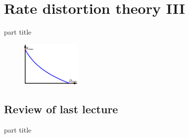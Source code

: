 
\DeclareMathOperator{\cwd}{codeword}
\newtheorem{proposition}{Proposition}
\usepackage{forest}
\usepackage{lipsum}
\usepackage{subcaption}


\section{Rate distortion theory III}

\begin{frame}
 \vspace{8.0ex}
\begin{center}
\begin{beamercolorbox}[sep=16pt,center]{part title}
\insertsection\par
\end{beamercolorbox}
\end{center}
\begin{figure}
\includegraphics[width=0.26\textwidth]{RD_II/RD_Plot_Final.png}
\captionsetup{labelformat=empty}
\end{figure}
\end{frame}




\subsection{Review of last lecture}

\begin{frame}
 \vspace{12.0ex}
\begin{center}
\begin{beamercolorbox}[sep=12pt,center]{part title}
\insertsubsection\par
\end{beamercolorbox}
\end{center}
\end{frame}

